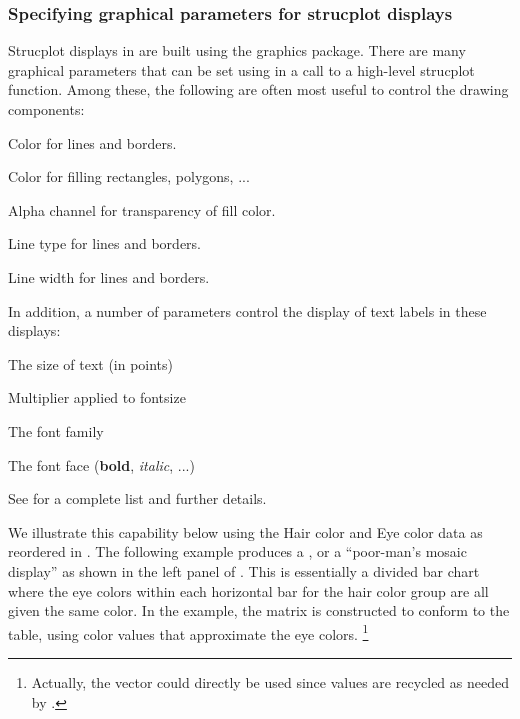 \documentclass[10pt,krantz2]{krantz}\usepackage[]{graphicx}\usepackage[]{color}
\begin{document}
\subsubsection{Specifying graphical parameters for strucplot displays}
Strucplot displays in  are built using the  graphics package.
There are many graphical parameters that can be set using 
in a call to a high-level strucplot function.  Among these, the following are
often most useful to control the drawing components:
\begin{proglist}
  \item[\code{col}]   Color for lines and borders.
  \item[\code{fill}] 	Color for filling rectangles, polygons, ...
  \item[\code{alpha}] 	Alpha channel for transparency of fill color.
  \item[\code{lty}] 	Line type for lines and borders.
  \item[\code{lwd}] 	Line width for lines and borders.
\end{proglist}
In addition, a number of parameters control the display of text labels in these displays:
\begin{proglist}
  \item[\code{fontsize}]   The size of text (in points)
  \item[\code{cex}] 	Multiplier applied to fontsize
  \item[\code{fontfamily}] 	The font family
  \item[\code{fontface}] 	The font face (\textbf{bold}, \textit{italic}, ...)
\end{proglist}
See  for a complete list and further details.

We illustrate this capability below using the Hair color and Eye color data
as reordered in .  The following example produces
a , or a ``poor-man's mosaic display''
as shown in the left panel of .
This is
essentially a divided bar chart where the eye colors
within each horizontal bar for the hair color group are all given the same
color.  In the example,
the matrix  is constructed to conform to the
 table, using color values that approximate the eye colors.
\footnote{Actually, the  vector could directly be
  used since values are recycled as needed by .}
\end{document}
